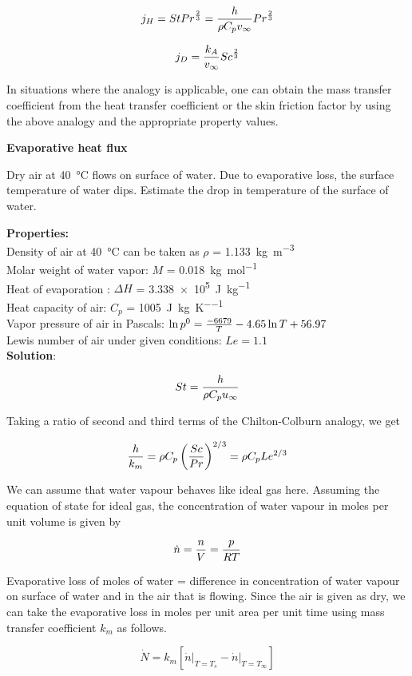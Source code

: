 $$j_H = St Pr^{2 \over 3} = {h \over \rho C_p v_\infty} Pr^{2 \over 3}$$

$$j_D = {k_A \over v_\infty} Sc^{2 \over 3} $$

In situations where the analogy is applicable, one can obtain the mass transfer
coefficient from the heat transfer coefficient or the skin friction factor by
using the above analogy and the appropriate property values.

\textbf{Evaporative heat flux}

Dry air at \SI{40}{\celsius} flows on surface of water. Due to evaporative loss, the surface temperature of water dips. Estimate the drop in temperature of the surface of water. 

{\bf Properties:}\\
Density of air at \SI{40}{\celsius} can be taken as $\rho$ = \SI{1.133}{\kilo\gram\per\meter\cubed} \\
Molar weight of water vapor: $M$ = \SI{0.018}{\kilo\gram\per\mole} \\
Heat of evaporation : $\Delta H$ = \SI{3.338e5}{\joule\per\kilo\gram} \\
Heat capacity of air: $C_p$ = \SI{1005}{\joule\per\kilo\gram\per\kelvin} \\
Vapor pressure of air in Pascals: $\ln p^0 = {-6679 \over T} - 4.65 \ln T + 56.97$ \\
Lewis number of air under given conditions: $Le = 1.1$ \\


{\bf Solution}:

$$ St = {h \over \rho C_p u_\infty} $$

Taking a ratio of second and third terms of the Chilton-Colburn analogy, we get

$$ {h \over k_m} = \rho C_p \left( Sc \over Pr \right)^{2/3} = \rho C_p Le^{2/3}$$

We can assume that water vapour behaves like ideal gas here. Assuming the equation of state for ideal gas, the concentration of water vapour in moles per unit volume is given by

$$ \dot{n} = {n \over V} = {p \over RT}$$

Evaporative loss of moles of water = difference in concentration of water vapour on surface of water and in the air that is flowing. Since the air is given as dry, we can take the evaporative loss in moles per unit area per unit time using mass transfer coefficient $k_m$ as follows.

$$ \dot{N} = k_m \left[ \left. \dot{n}\right|_{T=T_s} -  \left. \dot{n}\right|_{T=T_\infty}\right] $$

